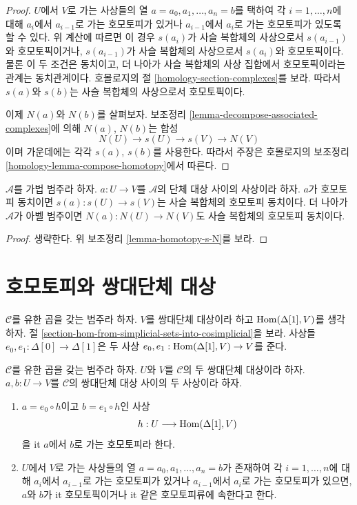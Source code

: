\begin{proof}
$U$에서 $V$로 가는 사상들의 열
$a = a_0, a_1, \ldots, a_n = b$를 택하여 각 $i = 1, \ldots, n$에
대해 $a_i$에서 $a_{i - 1}$로 가는 호모토피가 있거나
$a_{i - 1}$에서 $a_i$로 가는 호모토피가 있도록 할 수 있다.
위 계산에 따르면 이 경우 $s(a_i)$가 사슬 복합체의 사상으로서
$s(a_{i - 1})$와 호모토픽이거나, $s(a_{i - 1})$가 사슬 복합체의
사상으로서 $s(a_i)$와 호모토픽이다. 물론 이 두 조건은 동치이고,
더 나아가 사슬 복합체의 사상 집합에서 호모토픽이라는 관계는
동치관계이다. 호몰로지의 절 \ref{homology-section-complexes}를 보라.
따라서 $s(a)$와 $s(b)$는 사슬 복합체의 사상으로서 호모토픽이다.

\medskip\noindent
이제 $N(a)$와 $N(b)$를 살펴보자. 보조정리
\ref{lemma-decompose-associated-complexes}에 의해 $N(a)$, $N(b)$는
합성
$$
N(U) \to s(U) \to s(V) \to N(V)
$$
이며 가운데에는 각각 $s(a)$, $s(b)$를 사용한다. 따라서 주장은
호몰로지의 보조정리 \ref{homology-lemma-compose-homotopy}에서 따른다.
\end{proof}

\begin{lemma}
\label{lemma-homotopy-equivalence-s-N}
$\mathcal{A}$를 가법 범주라 하자. $a : U \to V$를
$\mathcal{A}$의 단체 대상 사이의 사상이라 하자. $a$가 호모토피 동치이면
$s(a) : s(U) \to s(V)$는 사슬 복합체의 호모토피 동치이다.
더 나아가 $\mathcal{A}$가 아벨 범주이면
$N(a) : N(U) \to N(V)$도 사슬 복합체의 호모토피 동치이다.
\end{lemma}

\begin{proof}
생략한다. 위 보조정리 \ref{lemma-homotopy-s-N}를 보라.
\end{proof}




\section{호모토피와 쌍대단체 대상}
\label{section-homotopy-cosimplicial}

\noindent
$\mathcal{C}$를 유한 곱을 갖는 범주라 하자. $V$를 쌍대단체 대상이라
하고 $\mathop{\mathrm{Hom}}\nolimits(\Delta[1], V)$를 생각하자. 절
\ref{section-hom-from-simplicial-sets-into-cosimplicial}을 보라.
사상들 $e_0, e_1 : \Delta[0] \to \Delta[1]$은 두 사상
$e_0, e_1 : \mathop{\mathrm{Hom}}\nolimits(\Delta[1], V) \to V$를 준다.

\begin{definition}
\label{definition-homotopy-cosimplicial}
$\mathcal{C}$를 유한 곱을 갖는 범주라 하자. $U$와 $V$를
$\mathcal{C}$의 두 쌍대단체 대상이라 하자.
$a, b : U \to V$를 $\mathcal{C}$의 쌍대단체 대상 사이의 두 사상이라 하자.
\begin{enumerate}
\item $a = e_0 \circ h$이고 $b = e_1 \circ h$인 사상
$$
h : U \longrightarrow \mathop{\mathrm{Hom}}\nolimits(\Delta[1], V)
$$
을 {it $a$에서 $b$로 가는 호모토피}라 한다.
\item $U$에서 $V$로 가는 사상들의 열
$a = a_0, a_1, \ldots, a_n = b$가 존재하여 각
$i = 1, \ldots, n$에 대해 $a_i$에서 $a_{i - 1}$로 가는 호모토피가
있거나 $a_{i - 1}$에서 $a_i$로 가는 호모토피가 있으면,
$a$와 $b$가 {it 호모토픽}이거나 {it 같은 호모토피류에 속한다}고 한다.
\end{enumerate}
\end{definition}

